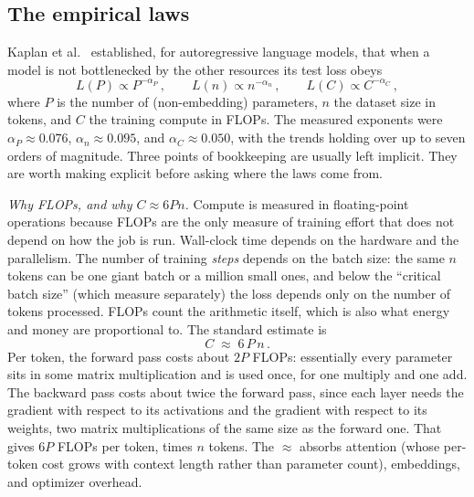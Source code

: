 \documentclass[11pt]{article}
\begin{document}
\subsection{The empirical laws}
\label{sec:scaling-empirical}

Kaplan et al.\ \cite{kaplan2020scaling} established, for autoregressive language models, that when a model is not bottlenecked by the other resources its test loss obeys
%
\begin{equation} \label{scaling-laws}
    L(P) \propto P^{-\alpha_P}\,,\qquad
    L(n) \propto n^{-\alpha_n}\,,\qquad
    L(C) \propto C^{-\alpha_C}\,,
\end{equation}
%
where $P$ is the number of (non-embedding) parameters, $n$ the dataset size in tokens, and $C$ the training compute in FLOPs. The measured exponents were $\alpha_P \approx 0.076$, $\alpha_n\approx 0.095$, and $\alpha_C\approx 0.050$, with the trends holding over up to seven orders of magnitude. Three points of bookkeeping are usually left implicit. They are worth making explicit before asking where the laws come from.

\emph{Why FLOPs, and why $C \approx 6Pn$.} Compute is measured in floating-point operations because FLOPs are the only measure of training effort that does not depend on how the job is run. Wall-clock time depends on the hardware and the parallelism. The number of training \emph{steps} depends on the batch size: the same $n$ tokens can be one giant batch or a million small ones, and below the ``critical batch size'' (which \cite{kaplan2020scaling} measure separately) the loss depends only on the number of tokens processed. FLOPs count the arithmetic itself, which is also what energy and money are proportional to. The standard estimate is
%
\begin{equation} \label{six-nd}
    C \;\approx\; 6\,P\,n\,.
\end{equation}
%
Per token, the forward pass costs about $2P$ FLOPs: essentially every parameter sits in some matrix multiplication and is used once, for one multiply and one add. The backward pass costs about twice the forward pass, since each layer needs the gradient with respect to its activations and the gradient with respect to its weights, two matrix multiplications of the same size as the forward one. That gives $6P$ FLOPs per token, times $n$ tokens. The $\approx$ absorbs attention (whose per-token cost grows with context length rather than parameter count), embeddings, and optimizer overhead.
\end{document}
